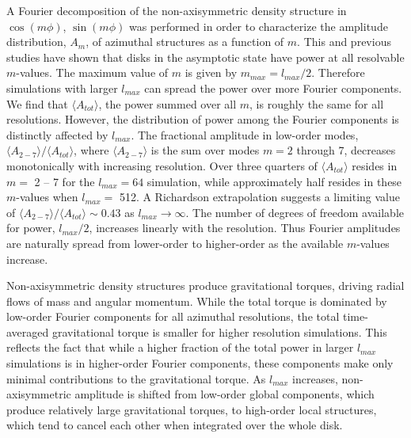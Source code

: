 \documentclass[manuscript]{aastex}
\begin{document}
A Fourier decomposition of the non-axisymmetric density structure 
in $\cos(m\phi)$, $\sin(m\phi)$ was performed in order to
characterize the amplitude distribution,  $A_m$,
of azimuthal structures as a function of $m$.  
This and previous studies have shown
that disks in the asymptotic state have power at all resolvable $m$-values.
The maximum value of  $m$ is given by
$m_{max} = l_{max}/2$.  Therefore simulations with larger $l_{max}$ can spread the
power over more Fourier components.
We find that $\langle A_{tot} \rangle$, the power summed over all $m$, is roughly the same
for all resolutions.
However, the distribution of power among the Fourier components
is distinctly affected by $l_{max} $.  
The fractional
amplitude in low-order modes, $\langle A_{2-7} \rangle / \langle A_{tot} \rangle$,
where $\langle A_{2-7} \rangle$ is 
the sum over modes $m = 2$ through 7, 
decreases monotonically with increasing resolution.  Over three quarters of $\langle A_{tot} \rangle$ resides
in $m =$ 2 -- 7 for the $l_{max} = 64$ simulation, while approximately half resides in these $m$-values when $l_{max} =$ 512.
A Richardson extrapolation suggests a limiting value of $\langle A_{2-7} \rangle / \langle A_{tot} \rangle \sim 0.43$ 
as $l_{max}\rightarrow \infty$.
The number of degrees of freedom available for power, $l_{max}/2$, increases linearly with the resolution.  Thus
Fourier amplitudes are naturally spread from lower-order to higher-order as the available $m$-values increase. 

Non-axisymmetric density structures produce gravitational torques, driving radial flows of mass and angular momentum.   While the total torque is dominated by low-order Fourier components for all azimuthal resolutions, the total
time-averaged gravitational torque  is smaller for higher resolution simulations.   This reflects the fact that while a higher fraction of the total power in larger $l_{max}$ simulations is in higher-order Fourier components, these components make only minimal contributions to the gravitational torque. As $l_{max}$ increases, non-axisymmetric amplitude is shifted from low-order global components, which produce relatively large gravitational torques, to high-order local structures, which tend to cancel each other when integrated over the whole disk. 
\end{document}
